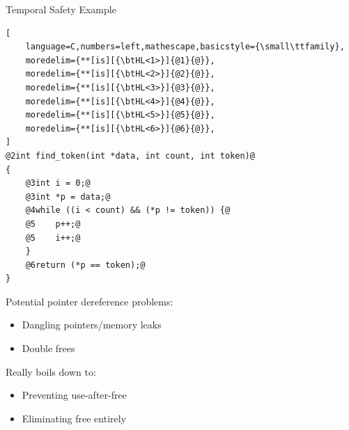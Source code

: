 \documentclass[aspectratio=169]{beamer}
\begin{document}
\begin{frame}[fragile]{Temporal Safety Example}
\footnotesize
{}
\begin{lstlisting}[
    language=C,numbers=left,mathescape,basicstyle={\small\ttfamily},
    moredelim={**[is][{\btHL<1>}]{@1}{@}},
    moredelim={**[is][{\btHL<2>}]{@2}{@}},
    moredelim={**[is][{\btHL<3>}]{@3}{@}},
    moredelim={**[is][{\btHL<4>}]{@4}{@}},
    moredelim={**[is][{\btHL<5>}]{@5}{@}},
    moredelim={**[is][{\btHL<6>}]{@6}{@}},
]
@2int find_token(int *data, int count, int token)@
{
    @3int i = 0;@
    @3int *p = data;@
    @4while ((i < count) && (*p != token)) {@
    @5    p++;@
    @5    i++;@
    }
    @6return (*p == token);@
}
\end{lstlisting}

\footnotesize{
Potential pointer dereference problems:
  \begin{itemize}
      \item Dangling pointers/memory leaks
      \item Double frees
  \end{itemize}

Really boils down to:
\begin{itemize}
    \item Preventing use-after-free
    \item Eliminating free entirely 
\end{itemize}
}
\end{frame}
\end{document}
